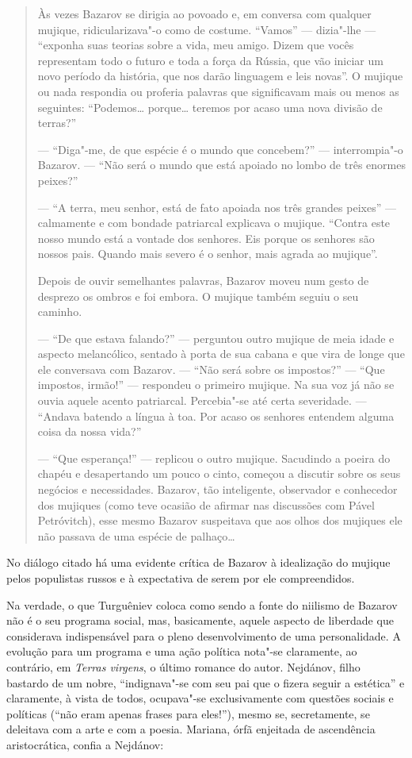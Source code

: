 \begin{quote}
Às vezes Bazarov se dirigia ao povoado e, em conversa com qualquer
mujique, ridicularizava"-o como de costume. ``Vamos'' --- dizia"-lhe --- ``exponha
suas teorias sobre a vida, meu amigo. Dizem que vocês representam todo o
futuro e toda a força da Rússia, que vão iniciar um novo período da
história, que nos darão linguagem e leis novas''. O mujique ou nada
respondia ou proferia palavras que significavam mais ou menos as
seguintes: ``Podemos\ldots{} porque\ldots{} teremos por acaso uma nova divisão
de terras?''

--- ``Diga"-me, de que espécie é o mundo que concebem?'' --- interrompia"-o
Bazarov. --- ``Não será o mundo que está apoiado no lombo de três enormes
peixes?''

--- ``A terra, meu senhor, está de fato apoiada nos três grandes peixes'' ---
calmamente e com bondade patriarcal explicava o mujique. ``Contra este
nosso mundo está a vontade dos senhores. Eis porque os senhores são
nossos pais. Quando mais severo é o senhor, mais agrada ao mujique''.

Depois de ouvir semelhantes palavras, Bazarov moveu num gesto de
desprezo os ombros e foi embora. O mujique também seguiu o seu caminho.

--- ``De que estava falando?'' --- perguntou outro mujique de meia idade e
aspecto melancólico, sentado à porta de sua cabana e que vira de longe
que ele conversava com Bazarov. --- ``Não será sobre os impostos?'' --- ``Que
impostos, irmão!'' --- respondeu o primeiro mujique. Na sua voz já não se
ouvia aquele acento patriarcal. Percebia"-se até certa severidade. ---
``Andava batendo a língua à toa. Por acaso os senhores entendem alguma
coisa da nossa vida?''

--- ``Que esperança!'' --- replicou o outro mujique. Sacudindo a poeira do
chapéu e desapertando um pouco o cinto, começou a discutir sobre os seus
negócios e necessidades. Bazarov, tão inteligente, observador e
conhecedor dos mujiques (como teve ocasião de afirmar nas discussões com
Pável Petróvitch), esse mesmo Bazarov suspeitava que aos olhos dos
mujiques ele não passava de uma espécie de palhaço\ldots{}
\end{quote}

No diálogo citado há uma evidente crítica de Bazarov à idealização do
mujique pelos populistas russos e à expectativa de serem por ele
compreendidos.

Na verdade, o que Turguêniev coloca como sendo a fonte do niilismo de
Bazarov não é o seu programa social, mas, basicamente, aquele aspecto
de liberdade que considerava indispensável para o pleno desenvolvimento
de uma personalidade. A evolução para um programa e uma ação política
nota"-se claramente, ao contrário, em \emph{Terras virgens}, o último
romance do autor. Nejdánov, filho bastardo de um nobre, ``indignava"-se
com seu pai que o fizera seguir a estética'' e claramente, à vista de
todos, ocupava"-se exclusivamente com questões sociais e políticas (``não
eram apenas frases para eles!''), mesmo se, secretamente, se deleitava
com a arte e com a poesia. Mariana, órfã enjeitada de ascendência
aristocrática, confia a Nejdánov:


